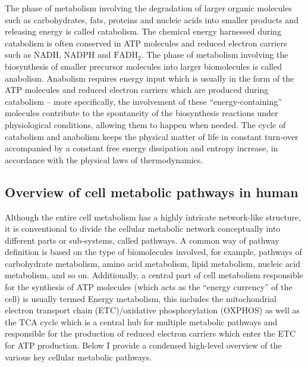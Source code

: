 \documentclass[12pt,twoside,openany,\mydriver]{thesis}  %
\begin{document}
The phase of metabolism involving the degradation of larger organic molecules such as carbohydrates, fats, proteins and nucleic acids into smaller products and releasing energy is called catabolism. The chemical energy harnessed during catabolism is often conserved in ATP molecules and reduced electron carriers such as NADH, NADPH and \(\mathrm{FADH_2}\). The phase of metabolism involving the biosynthesis of smaller precursor molecules into larger biomolecules is called anabolism. Anabolism requires energy input which is usually in the form of the ATP molecules and reduced electron carriers which are produced during catabolism -- more specifically, the involvement of these ``energy-containing'' molecules contribute to the spontaneity of the biosynthesis reactions under physiological conditions, allowing them to happen when needed. The cycle of catabolism and anabolism keeps the physical matter of life in constant turn-over accompanied by a constant free energy dissipation and entropy increase, in accordance with the physical laws of thermodynamics.

\hypertarget{overview-of-cell-metabolic-pathways-in-human}{%
\subsection{Overview of cell metabolic pathways in human}\label{overview-of-cell-metabolic-pathways-in-human}}

Although the entire cell metabolism has a highly intricate network-like structure, it is conventional to divide the cellular metabolic network conceptually into different parts or sub-systems, called pathways. A common way of pathway definition is based on the type of biomolecules involved, for example, pathways of carbohydrate metabolism, amino acid metabolism, lipid metabolism, nucleic acid metabolism, and so on. Additionally, a central part of cell metabolism responsible for the synthesis of ATP molecules (which acts as the ``energy currency'' of the cell) is usually termed Energy metabolism, this includes the mitochondrial electron transport chain (ETC)/oxidative phosphorylation (OXPHOS) as well as the TCA cycle which is a central hub for multiple metabolic pathways and responsible for the production of reduced electron carriers which enter the ETC for ATP production. Below I provide a condensed high-level overview of the various key cellular metabolic pathways.
\end{document}
